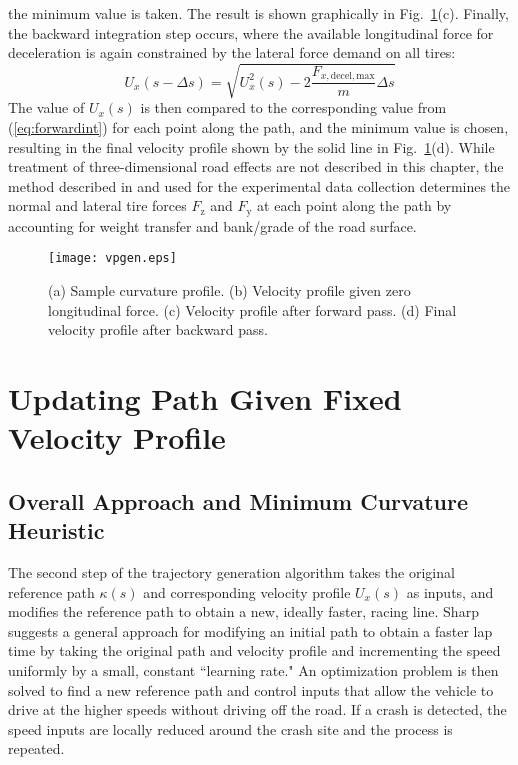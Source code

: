 the minimum value is taken. The result is shown graphically in Fig.~\ref{fig:VPgen}(c). Finally, the backward integration step occurs, where the available
longitudinal force for deceleration is again constrained by the lateral force demand on all tires:
\begin{equation}
\label{eq:backwardsint}
	U_x(s-\Delta s) = \sqrt{U^2_x(s)-\mathrm{2}\frac{F_{x,\mathrm{decel,max}}}{m}\Delta s}
\end{equation}
The value of $U_x(s)$ is then compared to the corresponding value from (\ref{eq:forwardint}) for each point along the path, and the minimum
value is chosen, resulting in the final velocity profile shown by the solid line in Fig.~\ref{fig:VPgen}(d). While treatment of three-dimensional road 
effects are not described in this chapter, the method described in \cite{subosits} and
used for the experimental data collection determines the normal and lateral tire forces $F_\mathrm{z}$ and $F_\mathrm{y}$ at each point along the path 
by accounting for weight transfer and bank/grade of the road surface. 

 \begin{figure}
\centering
\texttt{[image: vpgen.eps]}
\caption[Velocity profile generation illustration]{(a) Sample curvature profile. (b) Velocity profile given zero longitudinal force. (c) Velocity profile after forward pass. (d) Final velocity profile after backward pass. }
\label{fig:VPgen}
\end{figure}

\section{Updating Path Given Fixed Velocity Profile}
\label{sec:UPDATE}
\subsection{Overall Approach and Minimum Curvature Heuristic}
The second step of the trajectory generation algorithm takes the original reference path $\kappa(s)$ and corresponding velocity profile $U_x(s)$
as inputs, and modifies the reference path to obtain a new, ideally faster, racing line. Sharp \cite{sharp} suggests a general approach for modifying 
an initial path to obtain a faster lap time by taking the original path and velocity profile and incrementing the speed uniformly
by a small, constant ``learning rate." An optimization problem is then solved to find a new reference path and control inputs that allow the vehicle to
drive at the higher speeds without driving off the road. If a crash is detected, the speed inputs are locally reduced around the crash site and the process is repeated.

